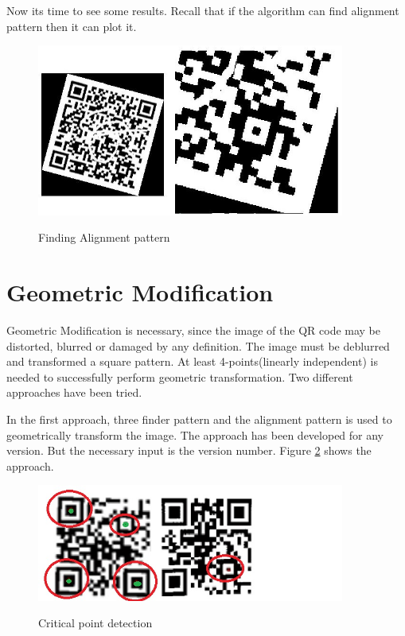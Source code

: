 Now its time to see some results. Recall that if the algorithm can find alignment pattern then it can plot it.

\begin{figure}[H]
  \caption{Finding Alignment pattern}
  \centering
    \includegraphics[width=0.9\textwidth]{figures/alignmentpattern1.jpg}
    \label{fig:3.5}
\end{figure}

\section{Geometric Modification}

Geometric Modification is necessary, since the image of the QR code may be distorted, blurred or damaged by any definition. The image must be deblurred and transformed a square pattern. At least 4-points(linearly independent) is needed to successfully perform geometric transformation. Two different approaches have been tried.

In the first approach, three finder pattern and the alignment pattern is used to geometrically transform the image. The approach has been developed for any version. But the necessary input is the version number. Figure \ref{fig:3.6} shows the approach.

\begin{figure}[H]
  \caption{Critical point detection}
  \centering
    \includegraphics[width=0.9\textwidth]{figures/GeoAP.jpg}
    \label{fig:3.6}
\end{figure}

